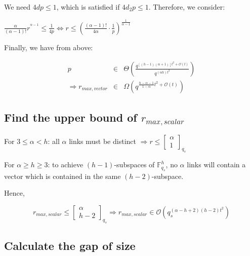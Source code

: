 We need $4dp\leq1$, which is satisfied if $4d_{2}p\leq1$. Therefore,
we consider:

$\frac{\alpha}{\left(\alpha-1\right)!}r^{^{\alpha-1}}\leq\frac{1}{4p}\Leftrightarrow r\leq\left(\frac{\left(\alpha-1\right)!}{4\alpha}\cdot\frac{1}{p}\right)^{\frac{1}{\alpha-1}}$

Finally, we have from above:

\begin{eqnarray*}
p & \in & \Theta\left(\frac{q^{\left[\left(h-1\right)\left(\alpha+1\right)\right]t^{2}+\mathcal{O}(t)}}{q^{\left(\alpha h\right)t^{2}}}\right)\\
\Rightarrow r_{max,vector} & \in & \Omega\left(q^{\frac{h-\alpha-1}{1-\alpha}t^{2}+\mathcal{O}(t)}\right)
\end{eqnarray*}


\subsection{Find the upper bound of $r_{max,scalar}$}

\noindent{}

For $3\leq\alpha<h$: all $\alpha$ links must be distinct $\Rightarrow r\leq\left[\begin{array}{c}
\alpha\\
1
\end{array}\right]_{q_{s}}$

For $\alpha\geq h\geq3$: to achieve $(h-1)$-subspaces of $\ensuremath{\mathbb{F}}_{q_{s}}^{h}$,
no $\alpha$ links will contain a vector which is contained in the
same $(h-2)$-subspace.

Hence,

\[
r_{max,scalar}\leq\left[\begin{array}{c}
\alpha\\
h-2
\end{array}\right]_{q_{s}}\Rightarrow r_{max,scalar}\in\mathcal{O}\left(q_{s}^{\left(\alpha-h+2\right)\left(h-2\right)t^{2}}\right)
\]


\subsection{Calculate the gap of size}

